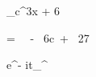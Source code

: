 \documentclass{article}
\begin{document}
\int_{c}^{3}{x + 6}

= \ \  - \ 6c\  + \ 27

e^{- i\omega t}\int_{}^{}
\end{document}
